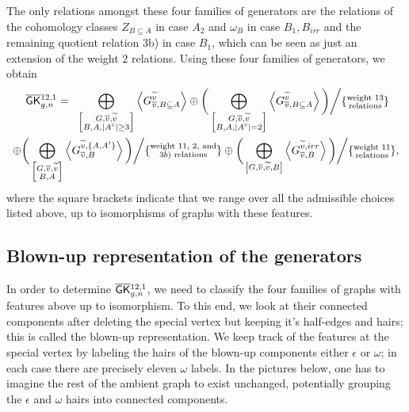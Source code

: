 The only relations amongst these four families of generators are the relations of the cohomology classes $Z_{B\subseteq A}$ in case $A_2$ and $\omega_B$ in case $B_1,B_{irr}$ and the remaining quotient relation 3b) in case $B_1$, which can be seen as just an extension of the weight $2$ relations. Using these four families of generators, we obtain
\begin{multline}
    \; \overline{\mathsf{GK}}{}^{12,1}_{g,n} = \;\;
    \bigoplus_{\left[\substack{G,\overline{v},\widetilde{v} \\ B,A,|A^c|\geq 3} \right]} \left< G_{\overline{v},B\subseteq A}^{\widetilde{v}} \right>
    \oplus \bigg( \bigoplus_{\left[\substack{G,\overline{v},\widetilde{v} \\ B,A,|A^c|=2 }\right]} \left< G_{\overline{v},B\subseteq A}^{\widetilde{v}} \right> \bigg) \bigg/ \{\substack{\text{weight 13}\\ \text{relations}}\} \\
    \oplus \bigg( \bigoplus_{\left[\substack{G,\overline{v},\widetilde{v} \\ B, A}\right]} \left<G_{\overline{v},B}^{\widetilde{v},\{A,A'\}} \right> \bigg) \bigg/ \{\substack{\text{weight 11, 2, and}\\ \text{$3b)$ relations}}\}
    \oplus \bigg( \bigoplus_{\left[G,\overline{v},\widetilde{v},B\right]} \left< G_{\overline{v},B}^{\widetilde{v},irr} \right> \bigg) \bigg/ \{\substack{\text{weight 11}\\ \text{relations}}\},
\end{multline}
where the square brackets indicate that we range over all the admissible choices listed above, up to isomorphisms of graphs with these features.


\subsection{Blown-up representation of the generators}
In order to determine $\overline{\mathsf{GK}}{}_{g,n}^{12,1}$, we need to classify the four families of graphs with features above up to isomorphism. To this end, we look at their connected components after deleting the special vertex but keeping it's half-edges and hairs; this is called the blown-up representation. We keep track of the features at the special vertex by labeling the hairs of the blown-up components either $\epsilon$ or $\omega$; in each case there are precisely eleven $\omega$ labels. In the pictures below, one has to imagine  the rest of the ambient graph to exist unchanged, potentially grouping the $\epsilon$ and $\omega$ hairs into connected components.

